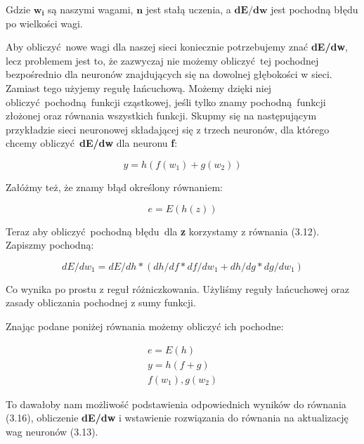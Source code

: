 \noindent Gdzie $\boldsymbol{w_i}$ są naszymi wagami, $\boldsymbol{n}$ jest stałą uczenia, a $\boldsymbol{dE/dw}$ jest pochodną błędu po wielkości wagi.\newline

Aby obliczyć nowe wagi dla naszej sieci koniecznie potrzebujemy znać \textbf{dE/dw}, lecz problemem jest to, że zazwyczaj nie możemy obliczyć tej pochodnej bezpośrednio dla neuronów znajdujących się na dowolnej głębokości w sieci. Zamiast tego użyjemy regułę łańcuchową. Możemy dzięki niej obliczyć pochodną funkcji cząstkowej, jeśli tylko znamy pochodną funkcji złożonej oraz równania wszystkich funkcji. Skupmy się na następującym przykładzie sieci neuronowej składającej się z trzech neuronów, dla którego chcemy obliczyć \textbf{dE/dw} dla neuronu \textbf{f}: 

\begin{equation}
y = h(f(w_1) + g(w_2))
\end{equation}

\noindent Załóżmy też, że znamy błąd określony równaniem:

\begin{equation}
e = E(h(z))
\end{equation}

\noindent Teraz aby obliczyć pochodną błędu dla \textbf{z} korzystamy z równania (3.12).
Zapiszmy pochodną:
 
\begin{equation}
dE/dw_1 = dE/dh * (dh/df * df/dw_1 + dh/dg * dg/dw_1)
\end{equation}

\noindent Co wynika po prostu z reguł różniczkowania. Użyliśmy reguły łańcuchowej oraz zasady obliczania pochodnej z sumy funkcji.\newline

\noindent Znając podane poniżej równania możemy obliczyć ich pochodne:
 
\begin{equation}
\begin{split}
e = E(h)
\\
y = h(f + g)
\\
f(w_1), g(w_2)
\end{split}
\end{equation}
 
To dawałoby nam możliwość podstawienia odpowiednich wyników do równania (3.16), obliczenie \textbf{dE/dw} i wstawienie rozwiązania do równania na aktualizację wag neuronów (3.13).\newline

